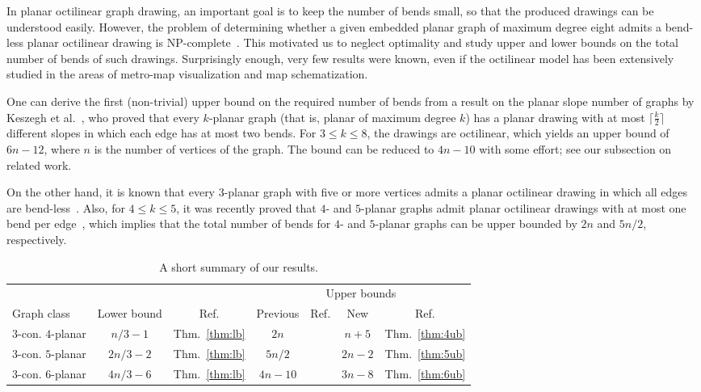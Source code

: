 \documentclass[a4paper,twoside,11pt]{article}
\begin{document}
In planar octilinear graph drawing, an important goal is to keep the
number of bends small, so that the produced drawings can be
understood easily. However, the problem of determining whether a
given embedded planar graph of maximum degree eight admits a
bend-less planar octilinear drawing is
NP-complete~\cite{Noellenburg05}. This motivated us to neglect
optimality and study upper and lower bounds on the total number of
bends of such drawings. Surprisingly enough, very few results were
known, even if the octilinear model has been extensively studied in
the areas of metro-map visualization and map schematization.

One can derive the first (non-trivial) upper bound on the required
number of bends from a result on the planar slope number of graphs
by Keszegh et al.~\cite{KPP13}, who proved that every $k$-planar
graph (that is, planar of maximum degree $k$) has a planar drawing
with at most $\lceil\frac{k}{2}\rceil$ different slopes in which
each edge has at most two bends. For $3 \leq k \leq 8$, the drawings
are octilinear, which yields an upper bound of $6n-12$, where $n$ is
the number of vertices of the graph. The bound can be reduced to
$4n-10$ with some effort; see our subsection on related work.

On the other hand, it is known that every $3$-planar graph with five
or more vertices admits a planar octilinear drawing in which all
edges are bend-less~\cite{Kant92,GLM14}. Also, for $4 \leq k \leq 5$,
it was recently proved that $4$- and $5$-planar graphs admit planar
octilinear drawings with at most one bend per edge~\cite{BGKK14},
which implies that the total number of bends for $4$- and $5$-planar
graphs can be upper bounded by $2n$ and $5n/2$, respectively.

\begin{table}[t!]
  \centering
  \caption{A short summary of our results.}
  \label{table:results}
  \medskip
  \begin{tabular}{lcccccc}
    \toprule
    & & &\multicolumn{4}{c}{Upper bounds}\\ 
    \cmidrule{4-7}
    Graph class & Lower bound & Ref. & Previous & Ref. & New & Ref.\\
    \midrule 
    $3$-con. $4$-planar & $n/3-1$  & Thm.~\ref{thm:lb} & $2n$    & \cite{BGKK14} & $n+5$   & Thm.~\ref{thm:4ub}\\
    $3$-con. $5$-planar & $2n/3-2$ & Thm.~\ref{thm:lb} & $5n/2$  & \cite{BGKK14} & $2n-2$  & Thm.~\ref{thm:5ub}\\
    $3$-con. $6$-planar & $4n/3-6$ & Thm.~\ref{thm:lb} & $4n-10$ & \cite{KPP13}  & $3n-8$  & Thm.~\ref{thm:6ub}\\
    \bottomrule
  \end{tabular} 
\end{table}
\end{document}
